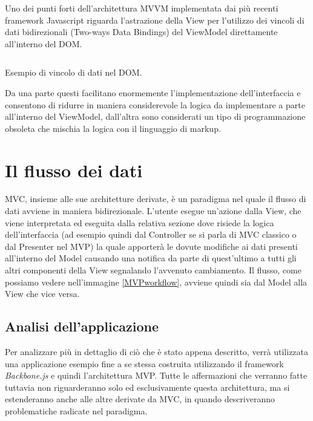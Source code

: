 \noindent
Uno dei punti forti dell'architettura MVVM implementata dai più recenti framework Javascript riguarda l'astrazione della View per l'utilizzo dei vincoli di dati bidirezionali (Two-ways Data Bindings) del ViewModel direttamente all'interno del DOM.

\begin{listing}[ht]
\inputminted{jsx}{sources/exampleMVVMDataBinding.js}
\caption{Esempio di vincolo di dati nel DOM.}
\label{exampleMVVMDataBinding}
\end{listing}

\noindent
Da una parte questi facilitano enormemente l'implementazione dell'interfaccia e consentono di ridurre in maniera considerevole la logica da implementare a parte all'interno del ViewModel, dall'altra sono considerati un tipo di programmazione obsoleta che mischia la logica con il linguaggio di markup.

\section{Il flusso dei dati}
MVC, insieme alle sue architetture derivate, è un paradigma nel quale il flusso di dati avviene in maniera bidirezionale. L'utente esegue un'azione dalla View, che viene interpretata ed eseguita dalla relativa sezione dove risiede la logica dell'interfaccia (ad esempio quindi dal Controller se si parla di MVC classico o dal Presenter nel MVP) la quale apporterà le dovute modifiche ai dati presenti all'interno del Model causando una notifica da parte di quest'ultimo a tutti gli altri componenti della View segnalando l'avvenuto cambiamento. Il flusso, come possiamo vedere nell'immagine \ref{MVPworkflow}, avviene quindi sia dal Model alla View che vice versa.

\subsection{Analisi dell'applicazione}
Per analizzare più in dettaglio di ciò che è stato appena descritto, verrà utilizzata una applicazione esempio fine a se stessa costruita utilizzando il framework \textit{Backbone.js} e quindi l'architettura MVP. Tutte le affermazioni che verranno fatte tuttavia non riguarderanno solo ed esclusivamente questa architettura, ma si estenderanno anche alle altre derivate da MVC, in quando descriveranno problematiche radicate nel paradigma.

